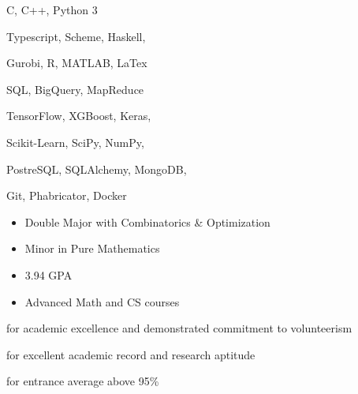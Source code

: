 C, C++, Python 3
\smallskip

Typescript, Scheme, Haskell,
\smallskip

Gurobi, R, MATLAB, LaTex

\divider\smallskip

SQL, BigQuery, MapReduce
\smallskip

TensorFlow, XGBoost, Keras,
\smallskip

Scikit-Learn, SciPy, NumPy,
\smallskip

PostreSQL, SQLAlchemy, MongoDB,

\divider\smallskip

Git, Phabricator, Docker


\begin{itemize}
    \item Double Major with Combinatorics \& Optimization
    \item Minor in Pure Mathematics
    \item 3.94 GPA
    \item Advanced Math and CS courses
\end{itemize}


for academic excellence and demonstrated commitment to volunteerism

\divider\smallskip

for excellent academic record and research aptitude

\divider\smallskip


\divider\smallskip

for entrance average above 95\%


